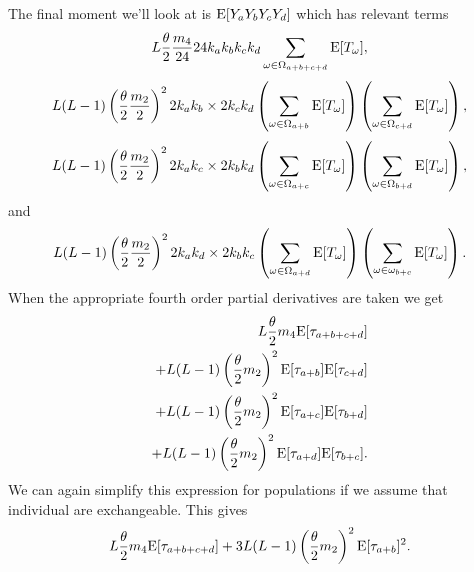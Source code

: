 The final moment we'll look at is $\mathrm{E}[Y_aY_bY_cY_d]$ which has relevant terms
\begin{equation*}
  L \frac{\theta}{2} \frac{m_4}{24} 24k_ak_bk_ck_d \sum_{\omega \in \Omega_{a+b+c+d}} \mathrm{E}[T_\omega],
\end{equation*}
\begin{equation*}
  L(L-1) \left(\frac{\theta}{2} \frac{m_2}{2}\right)^2 2k_ak_b \times 2k_ck_d \left( \sum_{\omega \in \Omega_{a+b}} \mathrm{E}[T_\omega] \right)
  \left( \sum_{\omega \in \Omega_{c+d}} \mathrm{E}[T_\omega] \right),
\end{equation*}
\begin{equation*}
  L(L-1) \left(\frac{\theta}{2} \frac{m_2}{2}\right)^2 2k_ak_c \times 2k_bk_d \left( \sum_{\omega \in \Omega_{a+c}} \mathrm{E}[T_\omega] \right)
  \left( \sum_{\omega \in \Omega_{b+d}} \mathrm{E}[T_\omega] \right),
\end{equation*}
and
\begin{equation*}
  L(L-1) \left(\frac{\theta}{2} \frac{m_2}{2}\right)^2 2k_ak_d \times 2k_bk_c \left( \sum_{\omega \in \Omega_{a+d}} \mathrm{E}[T_\omega] \right)
  \left( \sum_{\omega \in \omega_{b+c}} \mathrm{E}[T_\omega] \right).
\end{equation*}
When the appropriate fourth order partial derivatives are taken we get
\begin{align*}
  L \frac{\theta}{2} m_4 \mathrm{E}[\tau_{a+b+c+d}] \\
  + L(L-1)\left(\frac{\theta}{2} m_2\right)^2\mathrm{E}[\tau_{a+b}]\mathrm{E}[\tau_{c+d}] \\
  + L(L-1)\left(\frac{\theta}{2} m_2\right)^2\mathrm{E}[\tau_{a+c}]\mathrm{E}[\tau_{b+d}] \\
  + L(L-1)\left(\frac{\theta}{2} m_2\right)^2\mathrm{E}[\tau_{a+d}]\mathrm{E}[\tau_{b+c}].
\end{align*}
We can again simplify this expression for populations if we assume that
individual are exchangeable. This gives
\begin{equation}
  \label{eq:m1111}
  L \frac{\theta}{2} m_4 \mathrm{E}[\tau_{a+b+c+d}] + 3L(L-1)\left(\frac{\theta}{2} m_2\right)^2\mathrm{E}[\tau_{a+b}]^2.
\end{equation}

